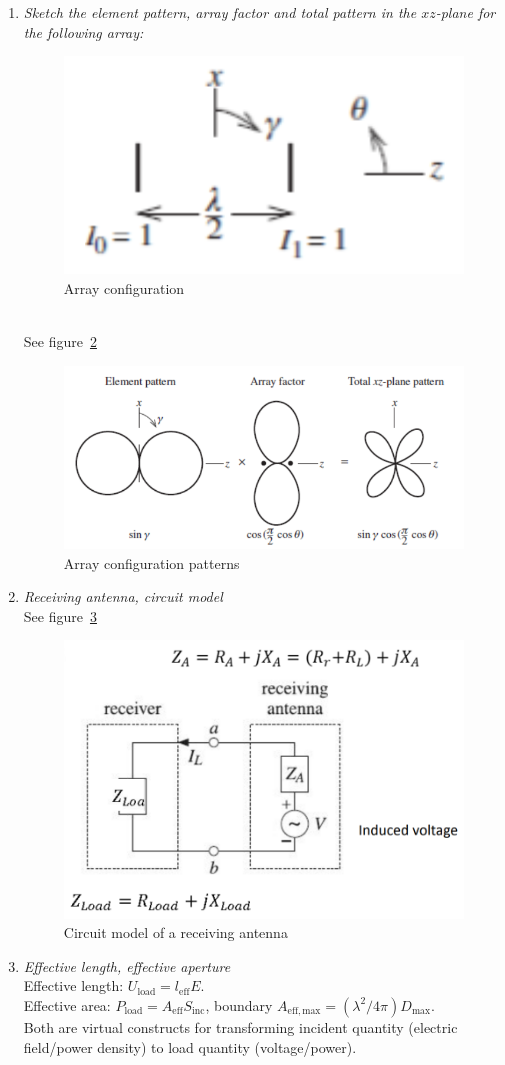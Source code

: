 \documentclass[11pt,a4paper]{article}
\begin{document}
\begin{enumerate}
    \item \emph{Sketch the element pattern, array factor and total pattern in the $xz$-plane for the following array:}
    \begin{figure}[!ht]
        \centering
        \includegraphics[width=.3\textwidth]{src/two-dipole-array.png}
        \caption{\label{fig:two-dipole-array}Array configuration}
    \end{figure}\\
    See figure~\ref{fig:two-dipole-array-pattern}
    \begin{figure}[!ht]
        \centering
        \includegraphics[width=.6\textwidth]{src/two-dipole-array-patterns.png}
        \caption{\label{fig:two-dipole-array-pattern}Array configuration patterns}
    \end{figure}

    \item \emph{Receiving antenna, circuit model}\\
    See figure~\ref{fig:circuit-model-receiving}
    \begin{figure}[!ht]
        \centering
        \includegraphics[width=.5\textwidth]{src/circuit-model-receiving.png}
        \caption{\label{fig:circuit-model-receiving}Circuit model of a receiving antenna}
    \end{figure}
    
    \item \emph{Effective length, effective aperture}\\
    Effective length: $U_{\mathrm{load}} = l_{\mathrm{eff}}E$.\\
    Effective area: $P_{\mathrm{load}} = A_{\mathrm{eff}} S_{\mathrm{inc}}$, boundary $A_{\mathrm{eff,max}} = (\lambda^2/4\pi)D_{\mathrm{max}}$.\\
    Both are virtual constructs for transforming incident quantity (electric field/power density) to load quantity (voltage/power).
    

\end{enumerate}
\end{document}
